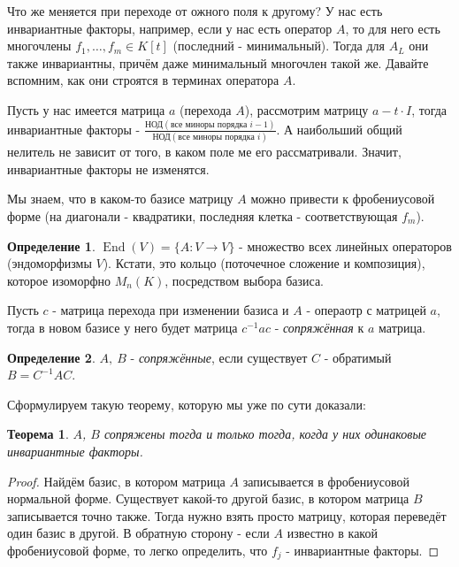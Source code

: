 \documentclass[a4paper,100pt]{article}
\theoremstyle{indented}
\newtheorem{theorem}{Теорема}
\theoremstyle{definition}
\newtheorem{defn}{Определение}
\theoremstyle{remark}
\DeclareMathOperator{\End}{End}
\begin{document}
Что же меняется при переходе от ожного поля к другому? У нас есть инвариантные факторы, например, если у нас есть оператор $A$, то для него есть многочлены $f_1, \ldots, f_m\in K[t]$ (последний - минимальный). Тогда для $A_L$ они также инвариантны, причём даже минимальный многочлен такой же. Давайте вспомним, как они строятся в терминах оператора $A$. \ 

Пусть у нас имеется матрица $a$ (перехода $A$), рассмотрим матрицу $a-t\cdot I$, тогда инвариантные факторы - $\frac{\text{НОД}(\text{все миноры порядка } i-1)}{\text{НОД}(\text{все миноры порядка } i)}$. А наибольший общий нелитель не зависит от того, в каком поле ме его рассматривали. Значит, инвариантные факторы не изменятся. \ 

Мы знаем, что в каком-то базисе матрицу $A$ можно привести к фробениусовой форме (на диагонали - квадратики, последняя клетка - соответствующая $f_m$). 

\begin{defn}
    $\End(V)=\{A:V\rightarrow V\}$ - множество всех линейных операторов (эндоморфизмы $V$). Кстати, это кольцо (поточечное сложение и композиция), которое изоморфно $M_n(K)$, посредством выбора базиса. 
\end{defn}

Пусть $c$ - матрица перехода при изменении базиса и $A$ - операотр с матрицей $a$, тогда в новом базисе у него будет матрица $c^{-1}ac$ - \textit{сопряжённая} к $a$ матрица.

\begin{defn}
    $A, \: B$ - \textit{сопряжённые}, если существует $C$ - обратимый $B=C^{-1}AC$. 
\end{defn}

Сформулируем такую теорему, которую мы уже по сути доказали: \\

\begin{theorem}
    $A$, $B$ сопряжены тогда и только тогда, когда у них одинаковые инвариантные факторы.
\end{theorem}

\begin{proof}
    Найдём базис, в котором матрица $A$ записывается в фробениусовой нормальной форме. Существует какой-то другой базис, в котором матрица $B$ записывается точно также. Тогда нужно взять просто матрицу, которая переведёт один базис в другой. В обратную сторону - если $A$ известно в какой фробениусовой форме, то легко определить, что $f_j$ - инвариантные факторы.
\end{proof}
\end{document}
